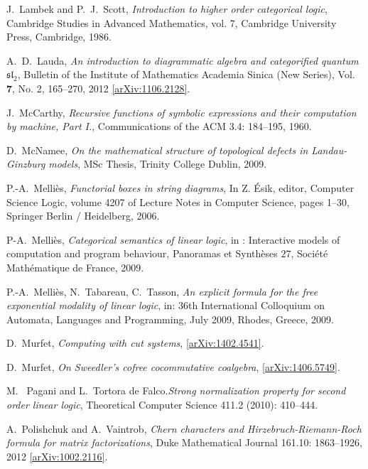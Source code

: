 \documentclass[english,letter paper,12pt,reqno]{article}
\theoremstyle{example}
\numberwithin{equation}{section}
\begin{document}
\begin{thebibliography}{BHLS03}
J.~Lambek and P.~J.~Scott, \textsl{Introduction to higher order categorical logic}, Cambridge Studies in Advanced Mathematics, vol. 7, Cambridge University Press, Cambridge, 1986.

A.~D.~Lauda, \textsl{An introduction to diagrammatic algebra and categorified quantum $\mathfrak{sl}_2$}, Bulletin of the Institute of Mathematics Academia Sinica (New Series), Vol. \textbf{7}, No. 2, 165--270, 2012 \href{http://arxiv.org/abs/1106.2128}{[arXiv:1106.2128]}.

J.~McCarthy, \textsl{Recursive functions of symbolic expressions and their computation by machine, Part I.}, Communications of the ACM 3.4: 184--195, 1960.

D.~McNamee, \textsl{On the mathematical structure of topological defects in
  {L}andau-{G}inzburg models}, MSc Thesis, Trinity College Dublin, 2009.
  
P.-A.~Melli\`{e}s, \textsl{Functorial boxes in string diagrams}, In Z. \'{E}sik, editor, Computer Science Logic,
volume 4207 of Lecture Notes in Computer Science, pages 1--30, Springer Berlin / Heidelberg,
2006.

P-A.~Melli\`{e}s, \textsl{Categorical semantics of linear logic}, in : Interactive models of computation and program behaviour, Panoramas et Synth\`{e}ses $27$, Soci\'{e}t\'{e} Math\'{e}matique de France, 2009.

P.-A.~Melli\`{e}s, N.~Tabareau, C.~Tasson, \textsl{An explicit formula for the free exponential modality of linear logic}, in: 36th International Colloquium on Automata, Languages and Programming, July 2009, Rhodes, Greece, 2009.

D.~Murfet, \textsl{Computing with cut systems}, \href{http://arxiv.org/abs/1402.4541}{[arXiv:1402.4541]}.

D.~Murfet, \textsl{On Sweedler's cofree cocommutative coalgebra}, \href{http://arxiv.org/abs/1406.5749}{[arXiv:1406.5749]}.

M.~ Pagani and L.~Tortora de Falco.\textsl{Strong normalization property for second order linear logic}, Theoretical Computer Science 411.2 (2010): 410--444.

A.~Polishchuk and A.~Vaintrob, \textsl{Chern characters and {H}irzebruch-{R}iemann-{R}och formula for matrix factorizations}, Duke Mathematical Journal 161.10: 1863--1926, 2012 \href{http://arxiv.org/abs/1002.2116}{[arXiv:1002.2116]}. 


\end{thebibliography}
\end{document}
